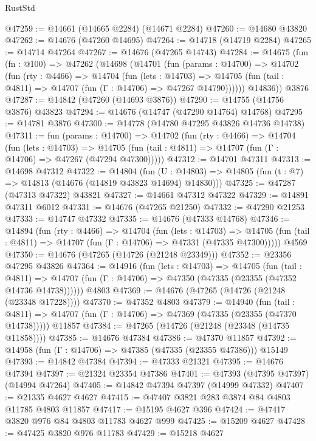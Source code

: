 \begin{lexlean}{RustStd}
\begin{coremodule}
@47259 := @14661 (@14665 @2284) (@14671 @2284)
@47260 := @14680 @43820
@47262 := @14676 (@47260 @14695)
@47264 := @14718 (@14719 @2284)
@47265 := @14714 @47264
@47267 := @14676 (@47265 @14743)
@47284 := @14675
    (fun (fn : @100) =>
    @47262
      (@14698
        (@14701
          (fun (params : @14700) =>
          @14702
            (fun (rty : @4466) =>
            @14704
              (fun (lets : @14703) =>
              @14705 (fun (tail : @4811) => @14707 (fun (Γ : @14706) => @47267 @14790))))))
        @14836))
    @3876
@47287 := @14842 (@47260 (@14693 @3876))
@47290 := @14755 (@14756 @3876) @43823
@47294 := @14676 (@14747 (@47290 @14764) @14768)
@47295 := @14781 @3876
@47300 := @14778 (@14780 @47295 @43826 @14736 @14738)
@47311 := fun (params : @14700) =>
  @14702
    (fun (rty : @4466) =>
    @14704
      (fun (lets : @14703) =>
      @14705 (fun (tail : @4811) => @14707 (fun (Γ : @14706) => @47267 (@47294 @47300)))))
@47312 := @14701 @47311
@47313 := @14698 @47312
@47322 := @14804
    (fun (U : @14803) => @14805 (fun (t : @7) => @14813 (@14676 (@14819 @43823 @14694) @14830)))
@47325 := @47287 (@47313 @47322) @43821
@47327 := @14661 @47312 @47322
@47329 := @14891 @47311 @6012
@47331 := @14676 (@47265 @21250)
@47332 := @47290 @21253
@47333 := @14747 @47332
@47335 := @14676 (@47333 @14768)
@47346 := @14894
    (fun (rty : @4466) =>
    @14704
      (fun (lets : @14703) =>
      @14705 (fun (tail : @4811) => @14707 (fun (Γ : @14706) => @47331 (@47335 @47300)))))
    @4569
@47350 := @14676 (@47265 (@14726 (@21248 @23349)))
@47352 := @23356 @47295 @43826
@47364 := @14916
    (fun (lets : @14703) =>
    @14705
      (fun (tail : @4811) =>
      @14707 (fun (Γ : @14706) => @47350 (@47335 (@23355 (@47352 @14736 @14738))))))
    @4803
@47369 := @14676 (@47265 (@14726 (@21248 (@23348 @17228))))
@47370 := @47352 @4803
@47379 := @14940
    (fun (tail : @4811) => @14707 (fun (Γ : @14706) => @47369 (@47335 (@23355 (@47370 @14738)))))
    @11857
@47384 := @47265 (@14726 (@21248 (@23348 (@14735 @11858))))
@47385 := @14676 @47384
@47386 := @47370 @11857
@47392 := @14958 (fun (Γ : @14706) => @47385 (@47335 (@23355 @47386))) @15149
@47393 := @14842 @47384
@47394 := @47333 @21321
@47395 := @14676 @47394
@47397 := @21324 @23354 @47386
@47401 := @47393 (@47395 @47397) (@14994 @47264)
@47405 := @14842 @47394 @47397 (@14999 @47332)
@47407 := @21335 @4627 @4627
@47415 := @47407 @3821 @283 @3874 @84 @4803 @11785 @4803 @11857
@47417 := @15195 @4627 @396
@47424 := @47417 @3820 @976 @84 @4803 @11783 @4627 @999
@47425 := @15209 @4627
@47428 := @47425 @3820 @976 @11783
@47429 := @15218 @4627

\end{coremodule}
\end{lexlean}
